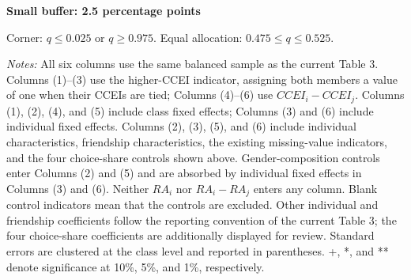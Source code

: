 \documentclass[11pt]{article}
\begin{document}
\clearpage\begin{center}{\large\bfseries Small buffer: 2.5 percentage points}\end{center}
Corner: $q\leq0.025$ or $q\geq0.975$. Equal allocation: $0.475\leq q\leq0.525$.
\begin{center}
\end{center}
{\footnotesize\textit{Notes:} All six columns use the same balanced sample as the current Table 3. Columns (1)--(3) use the higher-CCEI indicator, assigning both members a value of one when their CCEIs are tied; Columns (4)--(6) use $CCEI_i-CCEI_j$. Columns (1), (2), (4), and (5) include class fixed effects; Columns (3) and (6) include individual fixed effects. Columns (2), (3), (5), and (6) include individual characteristics, friendship characteristics, the existing missing-value indicators, and the four choice-share controls shown above. Gender-composition controls enter Columns (2) and (5) and are absorbed by individual fixed effects in Columns (3) and (6). Neither $RA_i$ nor $RA_i-RA_j$ enters any column. Blank control indicators mean that the controls are excluded. Other individual and friendship coefficients follow the reporting convention of the current Table 3; the four choice-share coefficients are additionally displayed for review. Standard errors are clustered at the class level and reported in parentheses. +, *, and ** denote significance at 10\%, 5\%, and 1\%, respectively.}
\end{document}
